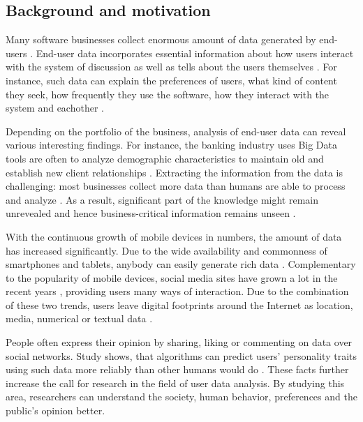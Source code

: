 \subsection{Background and motivation}
    Many software businesses collect enormous amount of data generated by end-users \cite{chinesemobilebankingusers, bigdatamanagementrevolution, inmon2007tapping}. End-user data incorporates essential information about how users interact with the system of discussion as well as tells about the users themselves \cite{jang2015noreciprocity, hu2014we, jang2016teensengagemorewithfewerphotos, han2016teensarefrommars, socialdiversityongithub}. For instance, such data can explain the preferences of users, what kind of content they seek, how frequently they use the software, how they interact with the system and eachother \cite{youyou2015computer, ottoni2013ladies}.

    Depending on the portfolio of the business, analysis of end-user data can reveal various interesting findings. For instance, the banking industry uses Big Data tools are often to analyze demographic characteristics to maintain old and establish new client relationships \cite{chinesemobilebankingusers, bigdatamanagementrevolution}. Extracting the information from the data is challenging: most businesses collect more data than humans are able to process and analyze \cite{inmon2007tapping, wegener2010integrating}. As a result, significant part of the knowledge might remain unrevealed and hence business-critical information remains unseen \cite{chinesemobilebankingusers, inmon2007tapping, wegener2010integrating, introtodatamining}. 

    With the continuous growth of mobile devices in numbers, the amount of data has increased significantly. Due to the wide availability and commonness of smartphones and tablets, anybody can easily generate rich data \cite{jang2016teensengagemorewithfewerphotos}. Complementary to the popularity of mobile devices, social media sites have grown a lot in the recent years \cite{hu2014we, ottoni2013ladies, bakhshi2014faces}, providing users many ways of interaction. Due to the combination of these two trends, users leave digital footprints around the Internet as location, media, numerical or textual data \cite{youyou2015computer}. 
    
    People often express their opinion by sharing, liking or commenting on data over social networks. Study shows, that algorithms can predict users' personality traits using such data more reliably than other humans would do \cite{youyou2015computer}. These facts further increase the call for research in the field of user data analysis. By studying this area, researchers can understand the society, human behavior, preferences and the public's opinion better.

